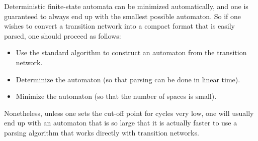 Deterministic finite-state automata can be minimized automatically, and one is guaranteed to always end up with the smallest possible automaton.
So if one wishes to convert a transition network into a compact format that is easily parsed, one should proceed as follows: 

\begin{itemize}
    \item Use the standard algorithm to construct an automaton from the transition network.
    \item Determinize the automaton (so that parsing can be done in linear time).
    \item Minimize the automaton (so that the number of spaces is small).
\end{itemize}

Nonetheless, unless one sets the cut-off point for cycles very low, one will usually end up with an automaton that is so large that it is actually faster to use a parsing algorithm that works directly with transition networks.
